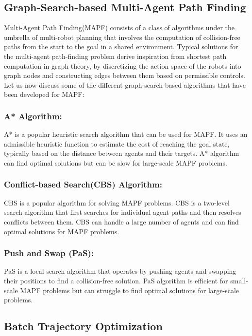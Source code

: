 \subsection{Graph-Search-based Multi-Agent Path Finding}\label{sec:MAPF}

Multi-Agent Path Finding(MAPF) consists of a class of algorithms under the umbrella of multi-robot planning that involves the computation of collision-free paths from the start to the goal in a shared environment. Typical solutions for the multi-agent path-finding problem derive inspiration from shortest path computation in graph theory, by discretizing the action space of the robots into graph nodes and constructing edges between them based on permissible controls. Let us now discuss some of the different graph-search-based algorithms that have been developed for MAPF:

\subsubsection{A* Algorithm:}\label{sec:A*}
A*\cite{A*} is a popular heuristic search algorithm that can be used for MAPF. It uses an admissible heuristic function to estimate the cost of reaching the goal state, typically based on the distance between agents and their targets. A* algorithm can find optimal solutions but can be slow for large-scale MAPF problems.

\subsubsection{Conflict-based Search(CBS) Algorithm:}
CBS\cite{CBS} is a popular algorithm for solving MAPF problems. CBS is a two-level search algorithm that first searches for individual agent paths and then resolves conflicts between them. CBS can handle a large number of agents and can find optimal solutions for MAPF problems.


\subsubsection{Push and Swap (PaS):}
PaS\cite{PaS} is a local search algorithm that operates by pushing agents and swapping their positions to find a collision-free solution. PaS algorithm is efficient for small-scale MAPF problems but can struggle to find optimal solutions for large-scale problems.

\subsection{Batch Trajectory Optimization}

